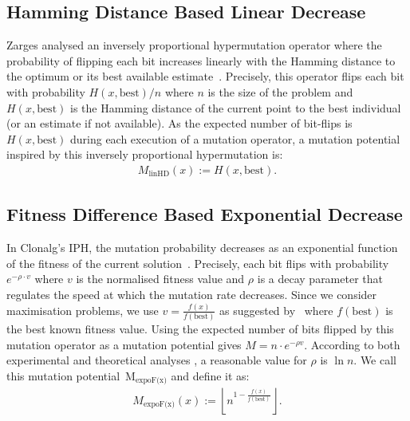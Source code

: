 \documentclass[lettersize,journal]{IEEEtran}
\newcommand{\expoF}{M$_{\text{expoF(x)}}$}
\begin{document}
 \subsection*{Hamming Distance Based Linear Decrease}
 Zarges analysed an inversely proportional hypermutation operator where the probability of flipping each bit increases linearly with the Hamming distance to the optimum or its best available estimate~\cite{Zarges2008}.
Precisely, this operator flips each bit with probability $H(x,\text{best})/n$ where $n$ is the size of the problem and $H(x,\text{best})$ is the Hamming distance of the current point to the best individual (or an estimate if not available). As the expected number of bit-flips is $H(x, \text{best})$ during each execution of a mutation operator, a mutation potential inspired by this inversely proportional hypermutation is:
\begin{align*}M_{\text{linHD}}(x):=H(x,\text{best}).
 \end{align*}
 
\subsection*{Fitness Difference Based Exponential Decrease}
In Clonalg's  IPH,  
 	the mutation probability decreases as an exponential function of the fitness of the current solution~\cite{DecastroVonzuben2002}. Precisely, each bit flips with probability $e^{-\rho \cdot v}$ where $v$ is the normalised fitness value and $\rho$ is a decay parameter that regulates the speed at which the mutation rate  decreases.
 Since we consider maximisation problems, we use $v=\frac{f(x)}{f(\text{best})}$ as suggested by~\cite{Zarges2008} where $f(\text{best})$ is the best known fitness value. Using the expected number of bits flipped by this mutation operator as a mutation potential gives $M=n \cdot e^{-\rho  v}$. According to both experimental and theoretical analyses 
 \cite{Zarges2008}, a reasonable value for $\rho$ is $\ln n$. We call this mutation potential~{\expoF } and define it as:
 \begin{align*} M_{\text{expoF(x)}}(x):=\left\lfloor n^{1-\frac{f(x)}{f(\text{best})}} \right\rfloor.
 \end{align*}
 
 
\end{document}
